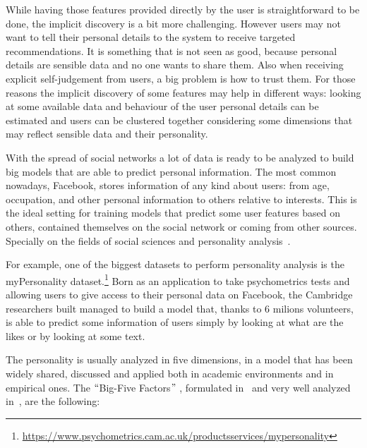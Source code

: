 While having those features provided directly by the user is straightforward to be done, the implicit discovery is a bit more challenging. However users may not want to tell their personal details to the system to receive targeted recommendations. It is something that is not seen as good, because personal details are sensible data and no one wants to share them. Also when receiving explicit self-judgement from users, a big problem is how to trust them. For those reasons the implicit discovery of some features may help in different ways: looking at some available data and behaviour of the user personal details can be estimated and users can be clustered together considering some dimensions that may reflect sensible data and their personality.

With the spread of social networks a lot of data is ready to be analyzed to build big models that are able to predict personal information. The most common nowadays, Facebook, stores information of any kind about users: from age, occupation, and other personal information to others relative to interests. This is the ideal setting for training models that predict some user features based on others, contained themselves on the social network or coming from other sources. Specially on the fields of social sciences and personality analysis~\cite{kosinski2015facebook}.

For example, one of the biggest datasets to perform personality analysis is the myPersonality dataset.\footnote{\url{https://www.psychometrics.cam.ac.uk/productsservices/mypersonality}} Born as an application to take psychometrics tests and allowing users to give access to their personal data on Facebook, the Cambridge researchers built managed to build a model that, thanks to 6 milions volunteers, is able to predict some information of users simply by looking at what are the likes or by looking at some text.

The personality is usually analyzed in five dimensions, in a model that has been widely shared, discussed and applied both in academic environments and in empirical ones. The $``$Big-Five Factors$"$ , formulated in~\cite{costa2008revised} and very well analyzed in~\cite{goldberg1993structure}, are the following:

